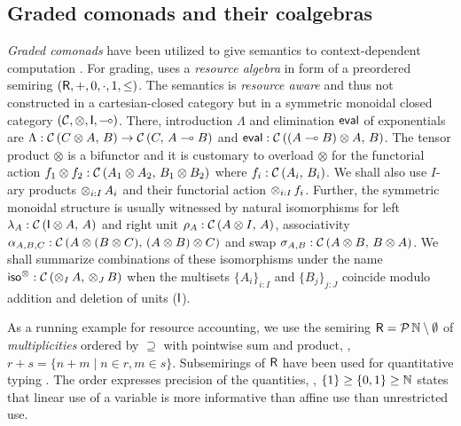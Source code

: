 \documentclass[acmsmall,review,anonymous]{acmart}\settopmatter{printfolios=true,printccs=false,printacmref=false}
\theoremstyle{remark}
\begin{document}

\subsection{Graded comonads and their coalgebras}

\emph{Graded comonads} have been utilized to give semantics to
context-dependent computation \citep{orchard:icfp14}.  For grading,
\loccit uses a \emph{resource algebra} in form of a preordered
semiring
$(\mathsf{R},{+},0,{\cdot},1,{\leq})$.
%
The semantics is \emph{resource aware} and thus not constructed in a
cartesian-closed category but in a symmetric monoidal closed category
$(\mathcal{C},\otimes,\mathsf{I},\multimap)$.
There,
introduction $\Lambda$ and elimination $\mathsf{eval}$ of
exponentials are
$\Lambda : \mathcal{C}\,(C \otimes A,\,B) \to \mathcal{C}\,(C,\,A \multimap B)$
and $\mathsf{eval} : \mathcal{C}\,((A \multimap B) \otimes A,\,B)$.  The tensor product
$\otimes$ is a bifunctor and it is customary to overload $\otimes$ for
the functorial action
$f_1 \otimes f_2 : \mathcal{C}\,(A_1 \otimes A_2,\,B_1 \otimes B_2)$ where
$f_i : \mathcal{C}\,(A_i,\,B_i)$.  We shall also use $I$-ary products
$\mathop\otimes_{i:I} A_i$ and their functorial action $\mathop\otimes_{i:I} f_i$.
Further, the symmetric monoidal structure is usually witnessed by
natural
isomorphisms for left $\lambda_A : \mathcal{C}\,(\mathsf{I} \otimes A,\,A)$ and right
unit $\rho_A : \mathcal{C}\,(A \otimes I,\,A)$, associativity
$\alpha_{A,B,C} : \mathcal{C}\,(A \otimes (B \otimes C),\,(A \otimes B) \otimes
  C)$
and swap $\sigma_{A,B} : \mathcal{C}\,(A \otimes B,\,B \otimes A)$.  We shall
summarize combinations of these isomorphisms under the name
$\mathsf{iso}^\otimes : \mathcal{C}\,(\mathop\otimes_{I} A,\,\mathop\otimes_{J} B)$ when the multisets
$\{A_i\}_{i:I}$ and $\{B_j\}_{j:J}$ coincide modulo addition and
deletion of units ($\mathsf{I}$).


As a running example for resource accounting,
we use the semiring $\mathsf{R} = \mathcal{P}\,\mathbb{N} \setminus \emptyset$ of
\emph{multiplicities} ordered by $\supseteq$ with pointwise sum and
product, \eg, $r + s = \{ n + m \mid n \in r, m \in s \}$.
Subsemirings of $\mathsf{R}$ have been used for quantitative typing
\cite{sergeyVytiniotisPeytonJones:popl14,mcBride:wadler60,atkey:lics18}.
The order expresses precision of the quantities, \eg,
$\{1\} \geq \{0,1\} \geq \mathbb{N}$ states that linear use of a variable is more informative than affine use than unrestricted use.
\end{document}
